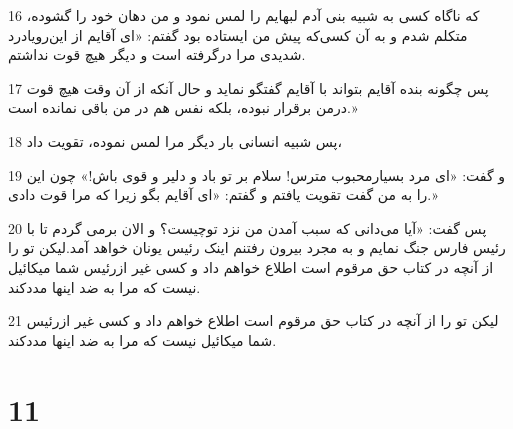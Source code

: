 \par 16 که ناگاه کسی به شبیه بنی آدم لبهایم را لمس نمود و من دهان خود را گشوده، متکلم شدم و به آن کسی‌که پیش من ایستاده بود گفتم: «ای آقایم از این‌رویادرد شدیدی مرا در‌گرفته است و دیگر هیچ قوت نداشتم.
\par 17 پس چگونه بنده آقایم بتواند با آقایم گفتگو نماید و حال آنکه از آن وقت هیچ قوت درمن برقرار نبوده، بلکه نفس هم در من باقی نمانده است.»
\par 18 پس شبیه انسانی بار دیگر مرا لمس نموده، تقویت داد،
\par 19 و گفت: «ای مرد بسیارمحبوب مترس! سلام بر تو باد و دلیر و قوی باش!» چون این را به من گفت تقویت یافتم و گفتم: «ای آقایم بگو زیرا که مرا قوت دادی.»
\par 20 پس گفت: «آیا می‌دانی که سبب آمدن من نزد توچیست؟ و الان برمی گردم تا با رئیس فارس جنگ نمایم و به مجرد بیرون رفتنم اینک رئیس یونان خواهد آمد.لیکن تو را از آنچه در کتاب حق مرقوم است اطلاع خواهم داد و کسی غیر ازرئیس شما میکائیل نیست که مرا به ضد اینها مددکند.
\par 21 لیکن تو را از آنچه در کتاب حق مرقوم است اطلاع خواهم داد و کسی غیر ازرئیس شما میکائیل نیست که مرا به ضد اینها مددکند.

\chapter{11}

